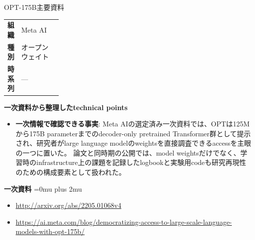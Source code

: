 \begin{technicalnote}{OPT-175B}{主要資料}
\begingroup
\begin{tabularx}{\linewidth}{@{}>{\bfseries}p{0.22\linewidth}X@{}}
組織 & Meta AI \\
種別 & オープンウェイト \\
時系列 & — \\
\end{tabularx}
\smallskip
{\bfseries 一次資料から整理したtechnical points}
\begin{itemize}[leftmargin=1.5em,itemsep=0.35em]
\item \textbf{一次情報で確認できる事実}: Meta AIの選定済み一次資料では、OPTは125Mから175B parameterまでのdecoder-only pretrained Transformer群として提示され、研究者がlarge language modelのweightsを直接調査できるaccessを主眼の一つに置いた。 論文と同時期の公開では、model weightsだけでなく、学習時のinfrastructure上の課題を記録したlogbookと実験用codeも研究再現性のための構成要素として扱われた。
\end{itemize}
\begin{minipage}{\linewidth}
\begin{samepage}
{\bfseries 一次資料}
\begingroup\sloppy
\Urlmuskip=0mu plus 2mu\relax
\begin{itemize}[leftmargin=1.5em,itemsep=0.25em]
\item {\scriptsize\url{http://arxiv.org/abs/2205.01068v4}}
\item {\scriptsize\url{https://ai.meta.com/blog/democratizing-access-to-large-scale-language-models-with-opt-175b/}}
\end{itemize}
\endgroup
\end{samepage}
\end{minipage}
\endgroup
\end{technicalnote}
\medskip

